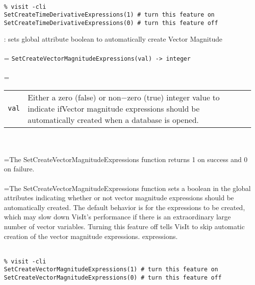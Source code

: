 \documentclass[10pt,a4paper]{report}
\begin{document}
\\[-6mm]
\begin{verbatim}% visit -cli
SetCreateTimeDerivativeExpressions(1) # turn this feature on
SetCreateTimeDerivativeExpressions(0) # turn this feature off
\end{verbatim}
\newpage


{}
: sets global attribute boolean to automatically create Vector Magnitude\\[-3mm]

 \\ 
\hangindent=\parindent 
\verb!SetCreateVectorMagnitudeExpressions(val) -> integer!\\ [-3mm]

 \\ 
\hangindent=\parindent 
\begin{tabular}{lp{9cm}}
\verb!val! & Either a zero (false) or non$-$zero (true) integer value to indicate ifVector magnitude expressions should be automatically created when a database is opened. \\
\end{tabular} \\[-2mm]


 \\ 
\hangindent=\parindent The SetCreateVectorMagnitudeExpressions function returns 1 on success and 0 on failure. \\[-3mm] 

 \\ 
\hangindent=\parindent The SetCreateVectorMagnitudeExpressions function sets a boolean in the  global attributes indicating whether or not vector magnitude expressions  should be automatically created. The default behavior is for the  expressions to be created, which may slow down VisIt's performance  if there is an extraordinary large number of vector variables.  Turning this  feature off tells VisIt to skip automatic creation of the vector magnitude expressions.  expressions. \\[-3mm] 

\\[-6mm]
\begin{verbatim}% visit -cli
SetCreateVectorMagnitudeExpressions(1) # turn this feature on
SetCreateVectorMagnitudeExpressions(0) # turn this feature off
\end{verbatim}
\newpage
\end{document}
